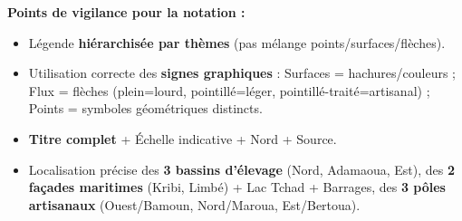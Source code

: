 \documentclass[11pt]{article}
\begin{document}
\begin{exoresolu}
\textbf{Points de vigilance pour la notation :}
\begin{itemize}
    \item Légende \textbf{hiérarchisée par thèmes} (pas mélange points/surfaces/flèches).
    \item Utilisation correcte des \textbf{signes graphiques} : Surfaces = hachures/couleurs ; Flux = flèches (plein=lourd, pointillé=léger, pointillé-traité=artisanal) ; Points = symboles géométriques distincts.
    \item \textbf{Titre complet} + Échelle indicative + Nord + Source.
    \item Localisation précise des \textbf{3 bassins d'élevage} (Nord, Adamaoua, Est), des \textbf{2 façades maritimes} (Kribi, Limbé) + Lac Tchad + Barrages, des \textbf{3 pôles artisanaux} (Ouest/Bamoun, Nord/Maroua, Est/Bertoua).
\end{itemize}
\end{exoresolu}
\end{document}
